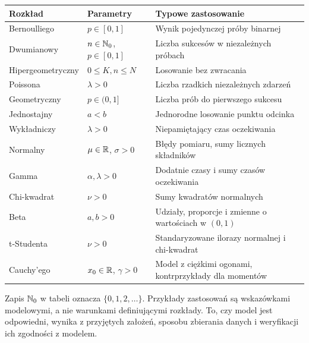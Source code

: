 \begin{center}
\small
\begin{tabular}{@{}p{3.0cm}p{4.1cm}p{5.9cm}@{}}
\hline
Rozkład & Parametry & Typowe zastosowanie \\
\hline
Bernoulliego & $p\in[0,1]$ & Wynik pojedynczej próby binarnej \\
Dwumianowy & $n\in\mathbb{N}_0$, $p\in[0,1]$ & Liczba sukcesów w niezależnych próbach \\
Hipergeometryczny & $0\leq K,n\leq N$ & Losowanie bez zwracania \\
Poissona & $\lambda>0$ & Liczba rzadkich niezależnych zdarzeń \\
Geometryczny & $p\in(0,1]$ & Liczba prób do pierwszego sukcesu \\
Jednostajny & $a<b$ & Jednorodne losowanie punktu odcinka \\
Wykładniczy & $\lambda>0$ & Niepamiętający czas oczekiwania \\
Normalny & $\mu\in\mathbb{R}$, $\sigma>0$ & Błędy pomiaru, sumy licznych składników \\
Gamma & $\alpha,\lambda>0$ & Dodatnie czasy i sumy czasów oczekiwania \\
Chi-kwadrat & $\nu>0$ & Sumy kwadratów normalnych \\
Beta & $a,b>0$ & Udziały, proporcje i zmienne o wartościach w $(0,1)$ \\
t-Studenta & $\nu>0$ & Standaryzowane ilorazy normalnej i chi-kwadrat \\
Cauchy'ego & $x_0\in\mathbb{R}$, $\gamma>0$ & Model z ciężkimi ogonami, kontrprzykłady dla momentów \\
\hline
\end{tabular}
\end{center}

\begin{uwaga}
Zapis $\mathbb{N}_0$ w tabeli oznacza $\{0,1,2,\ldots\}$.
Przykłady zastosowań są wskazówkami modelowymi, a nie
warunkami definiującymi rozkłady. To, czy model jest odpowiedni,
wynika z przyjętych założeń, sposobu zbierania danych
i weryfikacji ich zgodności z modelem.
\end{uwaga}

